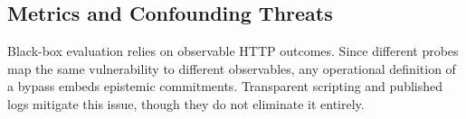 \subsection{Metrics and Confounding Threats}
Black-box evaluation relies on observable HTTP outcomes. Since different probes map the same vulnerability to different observables, any operational definition of a bypass embeds epistemic commitments. Transparent scripting and published logs mitigate this issue, though they do not eliminate it entirely.
